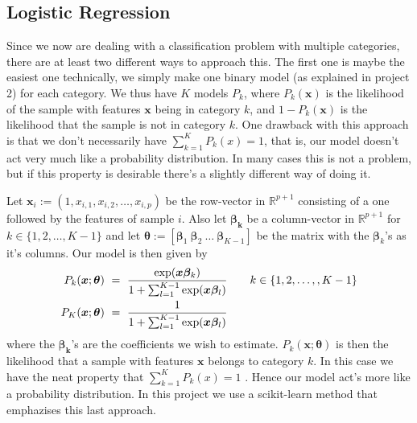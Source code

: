 \documentclass[parskip=half]{scrartcl}
\theoremstyle{definition}
\theoremstyle{remark}
\newcommand{\R}{\mathbb{R}}
\begin{document}
\subsection{Logistic Regression}
Since we now are dealing with a classification problem with multiple
categories, there are at least two different ways to approach this. 
The first one is maybe the easiest one technically, we simply make
one binary model (as explained in project 2) 
for each category. We thus have $K$ models $P_k$, 
where $P_k(\bm{x})$ is the likelihood of the sample with 
features $\bm{x}$ being in category $k$, and $1 - P_k(\bm{x})$ is
the likelihood that the sample is not in category $k$. One 
drawback with this approach is that we don't necessarily
have $\sum_{k=1}^K P_k(x) = 1$, that is, our model doesn't
act very much like a probability distribution. 
In many cases this is not a problem, but if this property is desirable
there's a slightly different way of doing it.
\par
Let $\bm{x}_i := (1, x_{i,1}, x_{i,2}, \dots, x_{i,p})$ 
be the row-vector in $\R^{p+1}$ consisting of a one followed by the 
features of sample $i$. Also let $\bm{\beta_k}$ be a column-vector in 
$\R^{p+1}$ for $k \in \{1,2, \dots, K-1\}$ and let 
$\bm{\theta} := [\bm{\beta}_1 \ \bm{\beta}_2 \ \dots \ \bm{\beta}_{K-1}]$ 
be the matrix with the $\bm{\beta}_k$'s as it's columns.
Our model is then given by
\begin{equation}
    \begin{split}
        P_k(\bm{x}; \bm{\theta}) \ = \ 
        \frac{\exp(\bm{x \beta}_k)}
        {1 + \sum_{l=1}^{K-1} \exp(\bm{x\beta_}l)}
        & \quad \quad k \in \{1,2, \dots, ,K - 1\}  \\
        P_K(\bm{x}; \bm{\theta}) \ = \ 
        \frac{1}
        {1 + \sum_{l=1}^{K-1} \exp(\bm{x\beta_}l)}
    \end{split}
\end{equation}
where the ${\bm{\beta_k}}$'s are the 
coefficients we wish to estimate. $P_k(\bm{x}; \bm{\theta})$ is then the 
likelihood that a sample with features $\bm{x}$ belongs to category $k$.
In this case we have the neat property that $\sum_{k=1}^K P_k(x) = 1$
\cite{htf:esl}.
Hence our model act's more like a probability distribution. In this project
we use a scikit-learn method that emphazises this last approach.
\par
\end{document}
